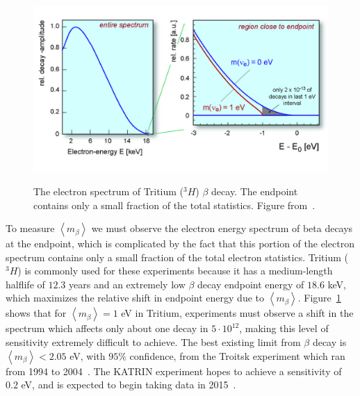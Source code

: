 \begin{figure}
\begin{center}
\includegraphics[keepaspectratio=true,width=\textwidth]{TritiumSpectrum.jpg}
\end{center}
\renewcommand{\baselinestretch}{1}
\small\normalsize
\begin{quote}
\caption{The electron spectrum of Tritium ($^3H$) $\beta$ decay.  The endpoint contains only a small fraction of the total statistics.  Figure from~\cite{Angrik:2005ep}.}
\label{fig:TritiumSpectrum}
\end{quote}
\end{figure}
\renewcommand{\baselinestretch}{2}
\small\normalsize

To measure $\left< m_\beta \right>$ we must observe the electron energy spectrum of beta decays at the endpoint, which is complicated by the fact that this portion of the electron spectrum contains only a small fraction of the total electron statistics.  Tritium ($^3H$) is commonly used for these experiments because it has a medium-length halflife of $12.3$ years and an extremely low $\beta$ decay endpoint energy of $18.6$ keV, which maximizes the relative shift in endpoint energy due to $\left< m_\beta \right>$.  Figure~\ref{fig:TritiumSpectrum} shows that for $\left< m_\beta \right> = 1$ eV in Tritium, experiments must observe a shift in the spectrum which affects only about one decay in $5 \cdot 10^{12}$, making this level of sensitivity extremely difficult to achieve.  The best existing limit from $\beta$ decay is $\left<m_\beta\right> < 2.05$ eV, with $95\%$ confidence, from the Troitsk experiment which ran from 1994 to 2004~\cite{OldTritium}.  The KATRIN experiment hopes to achieve a sensitivity of $0.2$ eV, and is expected to begin taking data in 2015~\cite{NewTritium,NewTritiumTimeline}.

